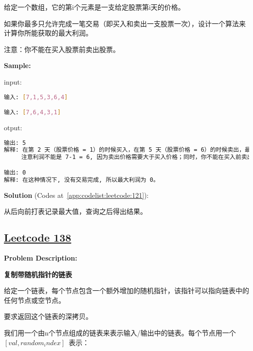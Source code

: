 给定一个数组，它的第i个元素是一支给定股票第i天的价格。\par

如果你最多只允许完成一笔交易（即买入和卖出一支股票一次），设计一个算法来计算你所能获取的最大利润。\par

注意：你不能在买入股票前卖出股票。\par


\textbf{Sample:}\par

input:\par

\begin{lstlisting}[language=bash]
输入: [7,1,5,3,6,4]

输入: [7,6,4,3,1]
\end{lstlisting}

otput:\par

\begin{lstlisting}[language=bash]
输出: 5
解释: 在第 2 天（股票价格 = 1）的时候买入，在第 5 天（股票价格 = 6）的时候卖出，最大利润 = 6-1 = 5 。
     注意利润不能是 7-1 = 6, 因为卖出价格需要大于买入价格；同时，你不能在买入前卖出股票。

输出: 0
解释: 在这种情况下, 没有交易完成, 所以最大利润为 0。
\end{lstlisting}

\textbf{Solution }(Codes at~\ref{app:codelist:leetcode:121}):\par

从后向前打表记录最大值，查询之后得出结果。\par



\subsection{\href{https://leetcode-cn.com/}{Leetcode 138}}\label{app:problemlist:leetcode:138}

\textbf{Problem Description:}\par

\textbf{复制带随机指针的链表}\par

给定一个链表，每个节点包含一个额外增加的随机指针，该指针可以指向链表中的任何节点或空节点。\par

要求返回这个链表的深拷贝。 \par

我们用一个由n个节点组成的链表来表示输入/输出中的链表。每个节点用一个 $ [val, random_index] $ 表示：\par

